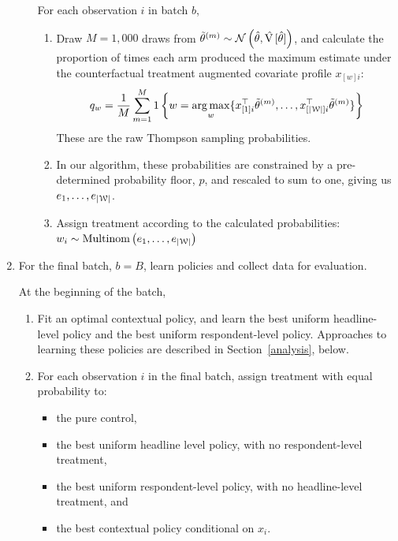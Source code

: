 \documentclass[letterpaper, 12pt, parskip=full,DIV=10]{scrartcl}
\begin{document}
\begin{enumerate}
\begin{enumerate}
For each observation $i$ in batch $b$,
\begin{enumerate}
 \item Draw $M=1,000$ draws from $\tilde \theta ^{(m)} \sim \mathcal{N}\left(\hat \theta,\hat{{\textrm V}\,}[\hat\theta]\right)$, and calculate the proportion of times each arm produced the maximum estimate under the counterfactual treatment augmented covariate profile  $x_{[w]i}$:
				\begin{align}
   q_w = \frac{1}{M} \sum_{m=1}^M 1\left\{ w = \underset{w}{\operatorname*{arg\,max}} \{ x_{[1]i}^\top \tilde \theta ^{(m)}, \dots, x_{[|{\EuScript W}|]i}^\top\tilde \theta^{(m)} \}  \right\}
				\end{align}
	These are the raw Thompson sampling probabilities. 	
\item In our algorithm, these probabilities are constrained by a pre-determined probability floor, $p$, and rescaled to sum to one, giving us $e_{1}, \dots, e_{|{\EuScript W}|}$. 
\item Assign treatment  according to the calculated probabilities: \\
$w_i \sim \textrm{Multinom} \left( e_{1}, \dots, e_{|{\EuScript W}|} \right)$
\end{enumerate}
\end{enumerate}

\item For the final batch,  $b = B$, learn policies and collect data for evaluation. 

At the beginning of the batch, 
\begin{enumerate}
  \item Fit an optimal contextual policy, and learn the best uniform headline-level policy and the best uniform respondent-level policy. Approaches to learning these policies are described in Section~\ref{analysis}, below. 
  \item For each observation $i$ in the final batch, assign treatment with equal probability to:\label{step:policies}
  \begin{itemize}
  \item the pure control, 
  \item the best uniform headline level policy, with no respondent-level treatment, 
  \item the best uniform respondent-level policy, with no headline-level treatment, and
  \item the best contextual policy conditional on $x_i$. 
  \end{itemize}
\end{enumerate}
\end{enumerate}
\end{document}

